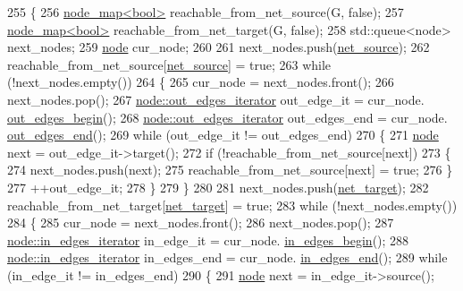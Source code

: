 \begin{DoxyCode}
255 \{
256     \mbox{\hyperlink{classnode__map}{node\_map<bool>}} reachable\_from\_net\_source(G, \textcolor{keyword}{false});
257     \mbox{\hyperlink{classnode__map}{node\_map<bool>}} reachable\_from\_net\_target(G, \textcolor{keyword}{false});
258     std::queue<node> next\_nodes;
259     \mbox{\hyperlink{classnode}{node}} cur\_node;
260 
261     next\_nodes.push(\mbox{\hyperlink{classmaxflow__pp_a20f2d05465acc2d7b777ea8025d12003}{net\_source}});
262     reachable\_from\_net\_source[\mbox{\hyperlink{classmaxflow__pp_a20f2d05465acc2d7b777ea8025d12003}{net\_source}}] = \textcolor{keyword}{true};
263     \textcolor{keywordflow}{while} (!next\_nodes.empty())
264     \{
265     cur\_node = next\_nodes.front();
266     next\_nodes.pop();
267     \mbox{\hyperlink{classnode_a90e17ed34de55072e8077f4367499a98}{node::out\_edges\_iterator}} out\_edge\_it = cur\_node.
      \mbox{\hyperlink{classnode_a7dcb80df22118cea04f77ca8c952d9c2}{out\_edges\_begin}}();
268     \mbox{\hyperlink{classnode_a90e17ed34de55072e8077f4367499a98}{node::out\_edges\_iterator}} out\_edges\_end = cur\_node.
      \mbox{\hyperlink{classnode_a7ce2ba5195a63d4df6b44299a02a9378}{out\_edges\_end}}();
269     \textcolor{keywordflow}{while} (out\_edge\_it != out\_edges\_end)
270     \{
271         \mbox{\hyperlink{classnode}{node}} next = out\_edge\_it->target();
272         \textcolor{keywordflow}{if} (!reachable\_from\_net\_source[next])
273         \{
274         next\_nodes.push(next);
275         reachable\_from\_net\_source[next] = \textcolor{keyword}{true};
276         \}
277         ++out\_edge\_it;
278     \}
279     \}
280 
281     next\_nodes.push(\mbox{\hyperlink{classmaxflow__pp_a10f0b047011e04cb4816a824da5b7892}{net\_target}});
282     reachable\_from\_net\_target[\mbox{\hyperlink{classmaxflow__pp_a10f0b047011e04cb4816a824da5b7892}{net\_target}}] = \textcolor{keyword}{true};
283     \textcolor{keywordflow}{while} (!next\_nodes.empty())
284     \{
285     cur\_node = next\_nodes.front();
286     next\_nodes.pop();
287     \mbox{\hyperlink{classnode_a9a96be92add7c1a2771bcd0431ebf8ab}{node::in\_edges\_iterator}} in\_edge\_it = cur\_node.
      \mbox{\hyperlink{classnode_a0c32377f370ae52ed2134ff8d4dac584}{in\_edges\_begin}}();
288     \mbox{\hyperlink{classnode_a9a96be92add7c1a2771bcd0431ebf8ab}{node::in\_edges\_iterator}} in\_edges\_end = cur\_node.
      \mbox{\hyperlink{classnode_a785cd330f8b4c5c47d3b6e936a7e744e}{in\_edges\_end}}();
289     \textcolor{keywordflow}{while} (in\_edge\_it != in\_edges\_end)
290     \{
291         \mbox{\hyperlink{classnode}{node}} next = in\_edge\_it->source();

\end{DoxyCode}
